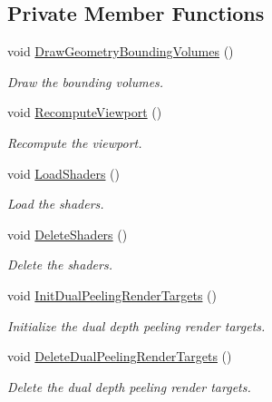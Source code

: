 \subsection*{Private Member Functions}
\begin{DoxyCompactItemize}
\item 
void \hyperlink{class_g_l_canvas_a674f6e5dc712d591efd37d9ee927a853}{Draw\+Geometry\+Bounding\+Volumes} ()
\begin{DoxyCompactList}\small\item\em Draw the bounding volumes. \end{DoxyCompactList}\item 
void \hyperlink{class_g_l_canvas_a8e5d4350658d48aa89dc6945387cb0e0}{Recompute\+Viewport} ()
\begin{DoxyCompactList}\small\item\em Recompute the viewport. \end{DoxyCompactList}\item 
void \hyperlink{class_g_l_canvas_a9b521effcd5bfb684f6bab80d284a4e4}{Load\+Shaders} ()
\begin{DoxyCompactList}\small\item\em Load the shaders. \end{DoxyCompactList}\item 
void \hyperlink{class_g_l_canvas_a342975ca2a4b968892ad212c5753f87e}{Delete\+Shaders} ()
\begin{DoxyCompactList}\small\item\em Delete the shaders. \end{DoxyCompactList}\item 
void \hyperlink{class_g_l_canvas_ab9f6c69aea4a15d1caff11e00c113e3f}{Init\+Dual\+Peeling\+Render\+Targets} ()
\begin{DoxyCompactList}\small\item\em Initialize the dual depth peeling render targets. \end{DoxyCompactList}\item 
void \hyperlink{class_g_l_canvas_ab4a82d05c1ccbc2a76d95318ce3d2cef}{Delete\+Dual\+Peeling\+Render\+Targets} ()
\begin{DoxyCompactList}\small\item\em Delete the dual depth peeling render targets. \end{DoxyCompactList}\end{DoxyCompactItemize}
